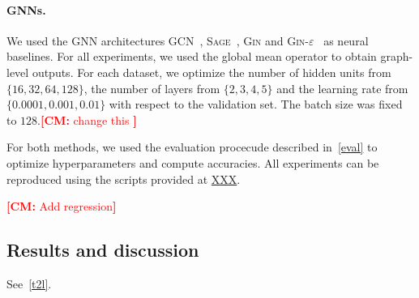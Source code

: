\documentclass{article}
\theoremstyle{definition}
\newcommand{\cm}[1]{{{\textcolor{red}{\textbf{[CM:} {#1}\textbf{]}}}}}
\begin{document}
\paragraph{GNNs.} We used the GNN architectures \textsc{GCN}~\cite{Kip+2017}, \textsc{Sage}~\cite{Ham+2017}, \textsc{Gin} and \textsc{Gin-$\varepsilon$}~\cite{Xu+2018b} as neural baselines. For all experiments, we used the global mean operator to obtain graph-level outputs. For each dataset, we optimize the number of hidden units from $
\{16, 32, 64, 128\}$, the number of layers from $ \{2, 3, 4, 5\}$ and the learning rate from $ \{0.0001, 0.001, 0.01 \}$ with respect to the validation set. The batch size was fixed to $128$.\cm{change this }

For both methods, we used the evaluation procecude described in~\cref{eval} to optimize hyperparameters and compute accuracies. All experiments can be reproduced using the scripts provided at \url{XXX}.

\cm{Add regression}

\subsection{Results and discussion}
See~\cref{t2l}.
\end{document}
